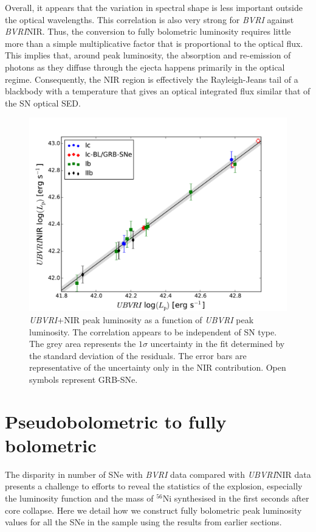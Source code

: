 \documentclass[a4paper,fleqn,usenatbib]{mnras}
\begin{document}
Overall, it appears that the variation in spectral shape is less important outside the optical wavelengths. This correlation is also very strong for \textit{BVRI} against \textit{BVRI}NIR. Thus, the conversion to fully bolometric luminosity requires little more than a simple multiplicative factor that is proportional to the optical flux. This implies that, around peak luminosity, the absorption and re-emission of photons as they diffuse through the ejecta happens primarily in the optical regime. Consequently, the NIR region is effectively the Rayleigh-Jeans tail of a blackbody with a temperature that gives an optical integrated flux similar that of the SN optical SED. 

\begin{figure}
\centering
\includegraphics[scale=0.4]{peak-lum-increase.pdf}
\caption{\textit{UBVRI}+NIR peak luminosity as a function of \textit{UBVRI} peak luminosity. The correlation appears to be independent of SN type. The grey area represents the $1\sigma$ uncertainty in the fit determined by the standard deviation of the residuals. The error bars are representative of the uncertainty only in the NIR contribution. Open symbols represent GRB-SNe.}
\label{fig:luminc}
\end{figure}

\section{Pseudobolometric to fully bolometric}
The disparity in number of SNe with \textit{BVRI} data compared with \textit{UBVRI}NIR data presents a challenge to efforts to reveal the statistics of the explosion, especially the luminosity function and the mass of $^{56}$Ni synthesised in the first seconds after core collapse. Here we detail how we construct fully bolometric peak luminosity values for all the SNe in the sample using the results from earlier sections.
\end{document}
